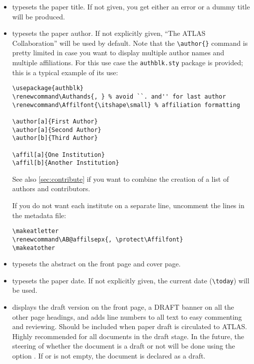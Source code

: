 \begin{itemize}
  \item {} typesets the paper title. If not
    given, you get either an error or a dummy title will be produced.

  \item {} typesets the paper author. If not
    explicitly given, \enquote{The ATLAS Collaboration} will be used by
    default. Note that the \verb|\author{}| command is pretty limited
    in case you want to display multiple author names and multiple
    affiliations. For this use case the \verb|authblk.sty| package is
    provided; this is a typical example of its use:
    \begin{verbatim}
\usepackage{authblk}
\renewcommand\Authands{, } % avoid ``. and'' for last author
\renewcommand\Affilfont{\itshape\small} % affiliation formatting

\author[a]{First Author}
\author[a]{Second Author}
\author[b]{Third Author}

\affil[a]{One Institution}
\affil[b]{Another Institution}
    \end{verbatim}
    See also \cref{sec:contribute} if you want to combine the creation of a list of authors and contributors.

    If you do not want each institute on a separate line, uncomment the lines in the metadata file:
    \begin{verbatim}
\makeatletter
\renewcommand\AB@affilsepx{, \protect\Affilfont}
\makeatother
    \end{verbatim}


  \item {} typesets the
    abstract on the front page and cover page.

  \item {} typesets the paper date. If not
    explicitly given, the current date (\verb|\today|) will be used.

  \item {} displays the draft
    version on the front page, a DRAFT banner on all the other page
    headings, and adds line numbers to all text to easy commenting and
    reviewing.
    Should be included when paper draft is circulated to ATLAS.
    Highly recommended for all documents in the draft stage.
    In the future, the steering of whether the document is a draft or not will be done
    using the option .
     If  or  is not empty,
    the document is declared as a draft.


\end{itemize}
